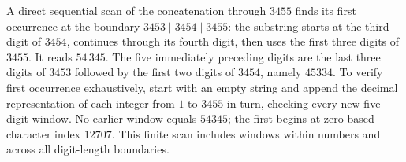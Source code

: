 A direct sequential scan of the concatenation through $3455$ finds its first occurrence at the boundary $3453\mid3454\mid3455$: the substring starts at the third digit of $3454$, continues through its fourth digit, then uses the first three digits of $3455$. It reads $54\,345$. The five immediately preceding digits are the last three digits of $3453$ followed by the first two digits of $3454$, namely $\boxed{45334}$. To verify first occurrence exhaustively, start with an empty string and append the decimal representation of each integer from $1$ to $3455$ in turn, checking every new five-digit window. No earlier window equals $54345$; the first begins at zero-based character index $12707$. This finite scan includes windows within numbers and across all digit-length boundaries.
